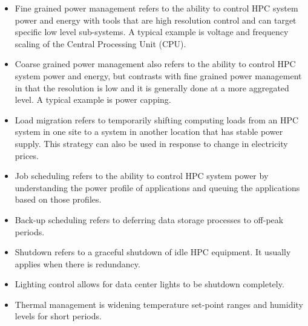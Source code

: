 \begin{itemize}
\item Fine grained power management refers to the ability to control HPC system power 
and energy with tools that are high resolution control and can target specific 
low level sub-systems. A typical example is voltage and frequency scaling of the Central Processing Unit (CPU).

\item Coarse grained power management also refers to the ability to control HPC 
system power and energy, but contrasts with fine grained power management in 
that the resolution is low and it is generally done at a more aggregated level. 
A typical example is power capping.

\item Load migration refers to temporarily shifting computing loads from 
an HPC system in one site to a system in another location that has stable power supply. 
This strategy can also be used in response to change in electricity prices.

\item Job scheduling refers to the ability to control HPC system power 
by understanding the power profile of applications and queuing the 
applications based on those profiles.

\item Back-up scheduling refers to deferring data storage processes to off-peak periods.

\item Shutdown refers to a graceful shutdown of idle HPC equipment. It usually 
applies when there is redundancy.

\item Lighting control allows for data center lights to be shutdown completely.

\item Thermal management is widening temperature set-point ranges and 
humidity levels for short periods.
\end{itemize}


